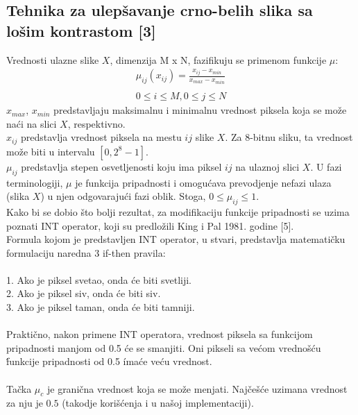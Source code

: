 \documentclass[12pt,a4paper]{article}
\theoremstyle{definition}
\theoremstyle{remark}
\theoremstyle{plain}
\begin{document}
\newpage
\subsection{Tehnika za ulep\v savanje crno-belih slika sa lo\v sim kontrastom [3]}

Vrednosti ulazne slike $X$, dimenzija M x N, fazifikuju se primenom funkcije $\mu$:\\
\begin{align*}
  \mu_{ij}(x_{ij}) =  \frac{x_{ij} - x_{min}}{x_{max} - x_{min}}\\ \\
  0\leq i \leq M, 0\leq j \leq N
\end{align*}
$x_{max}$, $x_{min}$ predstavljaju maksimalnu i minimalnu vrednost piksela koja se mo\v ze na\' ci na slici $X$, respektivno.\\
$x_{ij}$ predstavlja vrednost piksela na mestu $ij$ slike $X$. Za 8-bitnu sliku, ta vrednost mo\v ze biti u intervalu $[0, 2^8 - 1]$. \\ 
$\mu_{ij}$ predstavlja stepen osvetljenosti koju ima piksel $ij$ na ulaznoj slici $X$. U fazi terminologiji, $\mu$ je funkcija pripadnosti i omogu\' cava 
prevodjenje nefazi ulaza (slika $X$) u njen odgovaraju\' ci fazi oblik.
Stoga, $0\leq \mu_{ij} \leq 1$.\\

Kako bi se dobio \v sto bolji rezultat, za modifikaciju funkcije pripadnosti se uzima poznati INT operator, koji su predlo\v zili King i Pal 1981. godine [5].\\
Formula kojom je predstavljen INT operator, u stvari, predstavlja matemati\v cku formulaciju
naredna 3 if-then pravila: \\ \\
1. Ako je piksel svetao, onda \'ce biti svetliji.\\
2. Ako je piksel siv, onda \'ce biti siv. \\
3. Ako je piksel taman, onda \'ce biti tamniji.\\ \\
Prakti\v cno, nakon primene INT operatora, vrednost piksela sa funkcijom pripadnosti manjom od 0.5 \' ce se smanjiti. Oni pikseli sa ve\' com vredno\v s\' cu \' 
funkcije pripadnosti od 0.5 \' ima\' ce ve\' cu vrednost.
\\ \\
Ta\v cka $\mu_{c}$ je grani\v cna vrednost koja se mo\v ze menjati. Naj\v ce\v s\' ce uzimana vrednost za nju je $0.5$ 
(takodje kori\v s\' cenja i u na\v soj implementaciji). \\
\end{document}
